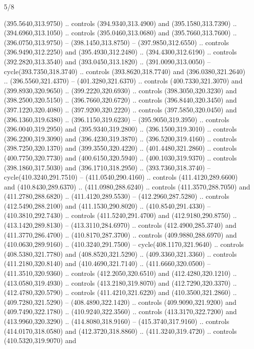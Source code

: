 \begin{flagdescription}{5/8}
\begin{scope}[xshift=0.5\flaglength,yshift=0.5\flagwidth,scale=\flagwidth/475.63]
\begin{scope}[y=0.8pt, x=0.8pt, yscale=-1, xscale=1,shift={(-450,-300)}]
\begin{scope}[cm={{1.0,0.0,0.0,1.0,(-0.0002,0.12556)}},cm={{1.0,0.0,0.0,1.0,(0.00179,0.0)}}]
\begin{scope}[fill=c00863d]
  (395.5640,313.9750) .. controls (394.9340,313.4900) and (395.1580,313.7390) ..
  (394.6960,313.1050) .. controls (395.0460,313.0680) and (395.7660,313.7600) ..
  (396.0750,313.9750) -- (398.1450,313.8750) -- (397.9850,312.6550) .. controls
  (396.9490,312.2250) and (395.4930,312.2480) .. (394.4300,312.6190) .. controls
  (392.2820,313.3540) and (393.0450,313.1820) .. (391.0090,313.0050) --
  cycle(393.7350,318.3740) .. controls (393.8620,318.7740) and
  (396.0380,321.2640) .. (396.5560,321.4370) -- (401.3280,321.6370) .. controls
  (400.7330,321.3070) and (399.8930,320.9650) .. (399.2220,320.6930) .. controls
  (398.3050,320.3230) and (398.2500,320.5150) .. (396.7660,320.6720) .. controls
  (396.8440,320.3450) and (397.1220,320.4080) .. (397.9200,320.2220) .. controls
  (397.5850,320.0450) and (396.1360,319.6380) .. (396.1150,319.6230) --
  (395.9050,319.3950) .. controls (396.0040,319.2950) and (395.9340,319.2800) ..
  (396.1500,319.3010) .. controls (396.2200,319.3090) and (396.4230,319.3870) ..
  (396.5200,319.4160) .. controls (398.7250,320.1370) and (399.3550,320.4220) ..
  (401.4480,321.2860) .. controls (400.7750,320.7730) and (400.6150,320.5940) ..
  (400.1030,319.9370) .. controls (398.1860,317.5030) and (396.1710,318.2950) ..
  (393.7360,318.3740) -- cycle(410.3240,291.7510) -- (411.0540,290.4160) ..
  controls (411.4120,289.6600) and (410.8430,289.6370) .. (411.0980,288.6240) ..
  controls (411.3570,288.7050) and (411.2780,288.6820) .. (411.4120,289.5530) --
  (412.2960,287.5280) .. controls (412.5490,288.2100) and (411.1530,290.8020) ..
  (410.8540,291.4330) -- (410.3810,292.7430) .. controls (411.5240,291.4700) and
  (412.9180,290.8750) .. (413.1420,289.8130) -- (413.3110,284.6970) .. controls
  (412.4900,285.3740) and (411.3770,286.4700) .. (410.8170,287.3700) .. controls
  (409.9880,288.6970) and (410.0630,289.9160) .. (410.3240,291.7500) --
  cycle(408.1170,321.9640) .. controls (408.5380,321.7780) and
  (408.8520,321.5290) .. (409.3360,321.3360) .. controls (411.2180,320.8140) and
  (410.4690,321.7140) .. (411.6660,320.0500) -- (411.3510,320.9360) .. controls
  (412.2050,320.6510) and (412.4280,320.1210) .. (413.0580,319.4930) .. controls
  (413.2180,319.8070) and (412.7290,320.3370) .. (412.4780,320.5790) .. controls
  (411.4210,321.6220) and (410.3500,321.2860) .. (409.7280,321.5290) --
  (408.4890,322.1420) .. controls (409.9090,321.9200) and (409.7490,322.1780) ..
  (410.9240,322.3560) .. controls (413.3170,322.7200) and (413.9960,320.3290) ..
  (414.8080,318.9160) -- (415.3740,317.9160) .. controls (414.0170,318.0580) and
  (412.3720,318.8860) .. (411.3240,319.4720) .. controls (410.5320,319.9070) and

\end{scope}
\end{scope}
\end{scope}
\end{scope}
\end{flagdescription}
